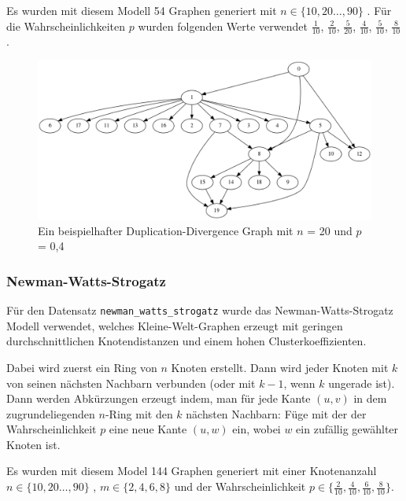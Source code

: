 \documentclass[12pt,a4paper,onecolumn,oneside,titlepage]{article}
\newcommand{\vars}{\texttt}
\begin{document}
Es wurden mit diesem Modell 54 Graphen generiert mit $n \in \{10,20…,90\}$ . Für die Wahrscheinlichkeiten $p$ wurden folgenden Werte verwendet $\frac{1}{10}$, $\frac{2}{10}$, $\frac{5}{20}$, $\frac{4}{10}$, $\frac{5}{10}$, $\frac{8}{10}$.
\begin{figure}
\includegraphics[scale=0.35]{dot/dot_dupdivergence.png}
\caption{Ein beispielhafter Duplication-Divergence Graph mit $n$ = 20 und $p$ = 0,4}
\label{fig:duplication-divergence}
\end{figure}

\subsubsection{Newman-Watts-Strogatz}
Für den Datensatz \vars{newman\_watts\_strogatz} wurde das Newman-Watts-Strogatz Modell verwendet\cite{Newman99}, welches Kleine-Welt-Graphen erzeugt mit geringen durchschnittlichen Knotendistanzen und einem hohen Clusterkoeffizienten.

Dabei wird zuerst ein Ring von $n$ Knoten erstellt. Dann wird jeder Knoten mit $k$ von seinen nächsten Nachbarn verbunden (oder mit $k-1$, wenn $k$ ungerade ist).
Dann werden Abkürzungen erzeugt indem, man für jede Kante $(u,v)$ in dem zugrundeliegenden $n$-Ring mit den $k$ nächsten Nachbarn: Füge mit der der Wahrscheinlichkeit $p$ eine neue Kante $(u,w)$ ein, wobei $w$ ein zufällig gewählter Knoten ist.

Es wurden mit diesem Model 144 Graphen generiert mit einer Knotenanzahl $n \in \{10,20…,90\}$  , $m \in \{2,4,6,8\}$ und der Wahrscheinlichkeit $p \in \{\frac{2}{10},\frac{4}{10},\frac{6}{10},\frac{8}{10}\}$.
\end{document}
